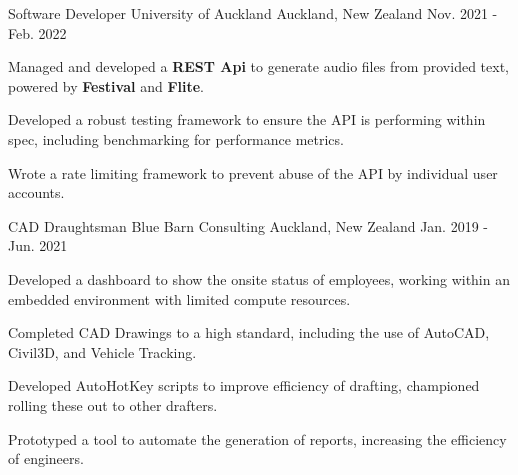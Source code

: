 \begin{cventries}
  \cventry
    {Software Developer} %
    {University of Auckland} %
    {Auckland, New Zealand} %
    {Nov. 2021 - Feb. 2022} %
    {
      \begin{cvitems} %
        \item {Managed and developed a \textbf{REST Api} to generate audio files from provided text, powered by \textbf{Festival} and \textbf{Flite}.}
        \item {Developed a robust testing framework to ensure the API is performing within spec, including benchmarking for performance metrics.}
        \item {Wrote a rate limiting framework to prevent abuse of the API by individual user accounts.}
      \end{cvitems}
    }


  \cventry
    {CAD Draughtsman} %
    {Blue Barn Consulting} %
    {Auckland, New Zealand} %
    {Jan. 2019 - Jun. 2021} %
    {
      \begin{cvitems} %
        \item {Developed a dashboard to show the onsite status of employees, working within an embedded environment with limited compute resources.}
        \item {Completed CAD Drawings to a high standard, including the use of AutoCAD, Civil3D, and Vehicle Tracking.}
        \item {Developed AutoHotKey scripts to improve efficiency of drafting, championed rolling these out to other drafters.}
        \item {Prototyped a tool to automate the generation of reports, increasing the efficiency of engineers.}
      \end{cvitems}
    }


\end{cventries}
